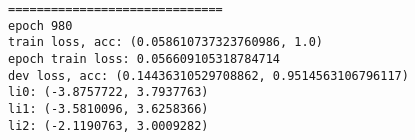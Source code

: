 \documentclass[11pt]{article}
\begin{document}
    \begin{Verbatim}[commandchars=\\\{\}]
==============================
epoch 980
train loss, acc: (0.058610737323760986, 1.0)
epoch train loss: 0.056609105318784714
dev loss, acc: (0.14436310529708862, 0.9514563106796117)
li0: (-3.8757722, 3.7937763)
li1: (-3.5810096, 3.6258366)
li2: (-2.1190763, 3.0009282)

    \end{Verbatim}

    \begin{center}
    \end{center}
    { \hspace*{\fill} \\}
    
\end{document}
